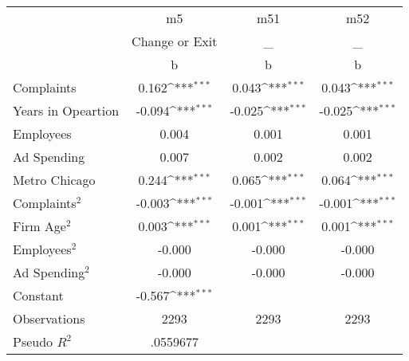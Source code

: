 {
\def\sym#1{\ifmmode^{#1}\else\(^{#1}\)\fi}
\begin{tabular}{l*{3}{c}}
\toprule
                    &          m5         &         m51         &         m52         \\
                    &Change or Exit         &           \_         &           \_         \\
                    &           b         &           b         &           b         \\
\midrule
Complaints          &       0.162\sym{***}&       0.043\sym{***}&       0.043\sym{***}\\
Years in Opeartion  &      -0.094\sym{***}&      -0.025\sym{***}&      -0.025\sym{***}\\
Employees           &       0.004         &       0.001         &       0.001         \\
Ad Spending         &       0.007         &       0.002         &       0.002         \\
Metro Chicago       &       0.244\sym{***}&       0.065\sym{***}&       0.064\sym{***}\\
Complaints$^{2}$    &      -0.003\sym{***}&      -0.001\sym{***}&      -0.001\sym{***}\\
Firm Age$^{2}$      &       0.003\sym{***}&       0.001\sym{***}&       0.001\sym{***}\\
Employees$^{2}$     &      -0.000         &      -0.000         &      -0.000         \\
Ad Spending$^{2}$   &      -0.000         &      -0.000         &      -0.000         \\
Constant            &      -0.567\sym{***}&                     &                     \\
\midrule
Observations        &        2293         &        2293         &        2293         \\
Pseudo \(R^{2}\)    &    .0559677         &                     &                     \\
\bottomrule
\end{tabular}
}
